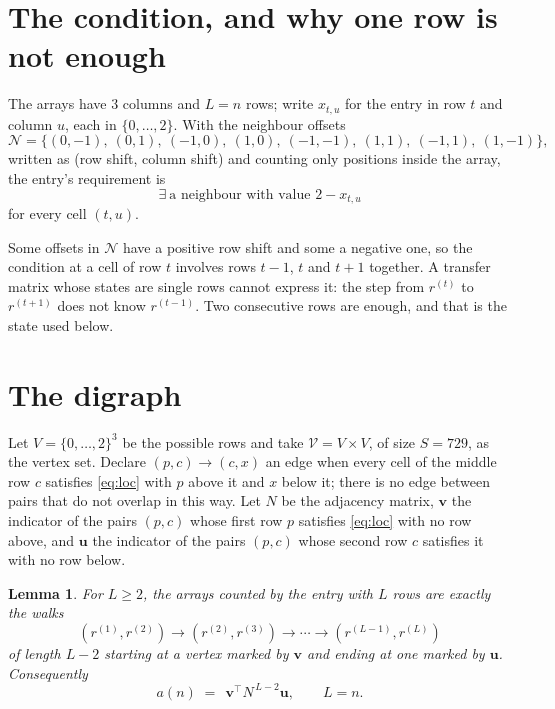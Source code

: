 \documentclass[11pt,a4paper]{article}
\theoremstyle{plain}
\newtheorem{lemma}[theorem]{Lemma}
\theoremstyle{definition}
\begin{document}
\section{The condition, and why one row is not enough}

The arrays have $3$ columns and $L=n$ rows; write $x_{t,u}$ for the entry in
row $t$ and column $u$, each in $\{0,\dots,2\}$. With the neighbour offsets
\[
\mathcal N=\{(0,-1),\ (0,1),\ (-1,0),\ (1,0),\ (-1,-1),\ (1,1),\ (-1,1),\ (1,-1)\},
\]
written as (row shift, column shift) and counting only positions inside the array, the
entry's requirement is
\begin{equation}\label{eq:loc}
\exists\ \text{a neighbour with value }2-x_{t,u}
\end{equation}
for every cell $(t,u)$.

Some offsets in $\mathcal N$ have a positive row shift and some a negative one, so the
condition at a cell of row $t$ involves rows $t-1$, $t$ and $t+1$ together. A transfer
matrix whose states are single rows cannot express it: the step from $r^{(t)}$ to
$r^{(t+1)}$ does not know $r^{(t-1)}$. Two consecutive rows are enough, and that is
the state used below.

\section{The digraph}

Let $V=\{0,\dots,2\}^{3}$ be the possible rows and take
$\mathcal V=V\times V$, of size $S=729$, as the vertex set. Declare $(p,c)\to(c,x)$ an edge
when every cell of the middle row $c$ satisfies \eqref{eq:loc} with $p$ above it and $x$
below it; there is no edge between pairs that do not overlap in this way. Let $N$ be the
adjacency matrix, $\mathbf{v}$ the indicator of the pairs $(p,c)$ whose first row $p$
satisfies \eqref{eq:loc} with no row above, and $\mathbf{u}$ the indicator of
the pairs $(p,c)$ whose second row $c$ satisfies it with no row below.

\begin{lemma}\label{lem:walk}
For $L\ge2$, the arrays counted by the entry with $L$ rows are exactly the walks
\[
(r^{(1)},r^{(2)})\to(r^{(2)},r^{(3)})\to\cdots\to(r^{(L-1)},r^{(L)})
\]
of length $L-2$ starting at a vertex marked by $\mathbf{v}$ and ending at one marked by
$\mathbf{u}$. Consequently
\[
a(n)\;=\;\,\mathbf{v}^{\!\top}N^{\,L-2}\mathbf{u},\qquad L=n .
\]
\end{lemma}
\end{document}
